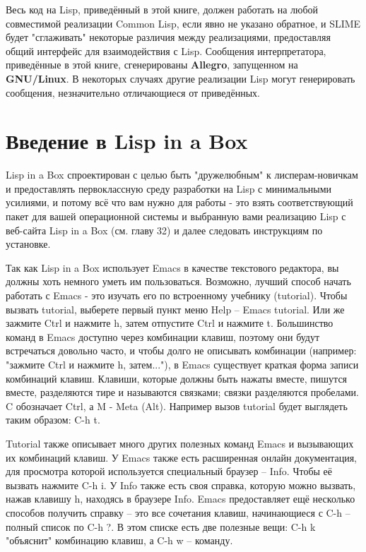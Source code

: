 Весь код на Lisp, приведённый в этой книге, должен работать на любой совместимой
реализации Common Lisp, если явно не указано обратное, и SLIME будет "сглаживать"
некоторые различия между реализациями, предоставляя общий интерфейс для взаимодействия с
Lisp. Сообщения интерпретатора, приведённые в этой книге, сгенерированы \textbf{Allegro},
запущенном на \textbf{GNU/Linux}. В некоторых случаях другие реализации Lisp могут
генерировать сообщения, незначительно отличающиеся от приведённых.

\section{Введение в Lisp in a Box}

Lisp in a Box спроектирован с целью быть "дружелюбным" к лисперам-новичкам и предоставлять
первоклассную среду разработки на Lisp с минимальными усилиями, и потому всё что вам нужно
для работы - это взять соответствующий пакет для вашей операционной системы и выбранную
вами реализацию Lisp с веб-сайта Lisp in a Box (см. главу 32) и далее следовать
инструкциям по установке.

Так как Lisp in a Box использует Emacs в качестве текстового редактора, вы должны хоть
немного уметь им пользоваться. Возможно, лучший способ начать работать с Emacs - это
изучать его по встроенному учебнику (tutorial). Чтобы вызвать tutorial, выберете первый
пункт меню Help -- Emacs tutorial. Или же зажмите Ctrl и нажмите h, затем отпустите Ctrl и
нажмите t. Большинство команд в Emacs доступно через комбинации клавиш, поэтому они будут
встречаться довольно часто, и чтобы долго не описывать комбинации (например: "зажмите Ctrl
и нажмите h, затем..."), в Emacs существует краткая форма записи комбинаций
клавиш. Клавиши, которые должны быть нажаты вместе, пишутся вместе, разделяются тире и
называются связками; связки разделяются пробелами. C обозначает Ctrl, а M - Meta
(Alt). Например вызов tutorial будет выглядеть таким образом: C-h t.

Tutorial также описывает много других полезных команд Emacs и вызывающих их комбинаций
клавиш. У Emacs также есть расширенная онлайн документация, для просмотра которой
используется специальный браузер -- Info. Чтобы её вызвать нажмите C-h i. У Info также
есть своя справка, которую можно вызвать, нажав клавишу h, находясь в браузере Info. Emacs
предоставляет ещё несколько способов получить справку -- это все сочетания клавиш,
начинающиеся с C-h -- полный список по C-h ?. В этом списке есть две полезные вещи: C-h k
"объяснит" комбинацию клавиш, а C-h w -- команду.

